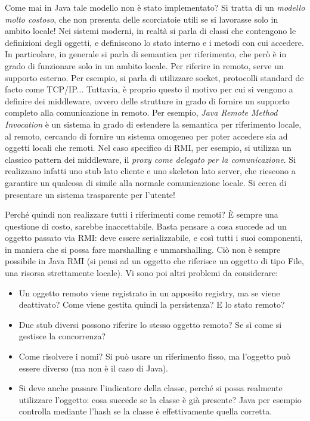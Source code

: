 Come mai in Java tale modello non è stato implementato? Si tratta di un
\textit{modello molto costoso}, che non presenta delle scorciatoie utili se si
lavorasse solo in ambito locale!
Nei sistemi moderni, in realtà si parla di classi che contengono le definizioni
degli oggetti, e definiscono lo stato interno e i metodi con cui accedere. In
particolare, in generale si parla di semantica per riferimento, che però è in
grado di funzionare solo in un ambito locale. Per riferire in remoto, serve un
supporto esterno. Per esempio, si parla di utilizzare socket, protocolli
standard de facto come TCP/IP...
Tuttavia, è proprio questo il motivo per cui si vengono a definire dei
middleware, ovvero delle strutture in grado di fornire un supporto completo alla 
comunicazione in remoto. Per esempio, \textit{Java Remote Method Invocation} è 
un sistema in grado di estendere la semantica per riferimento locale, al remoto, 
cercando di fornire un sistema omogeneo per poter accedere sia ad oggetti locali 
che remoti. Nel caso specifico di RMI, per esempio, si utilizza un classico 
pattern dei middleware, il \textit{proxy come delegato per la comunicazione}. Si 
realizzano infatti uno stub lato cliente e uno skeleton lato server, che 
riescono a garantire un qualcosa di simile alla normale comunicazione locale. Si 
cerca di presentare un sistema trasparente per l'utente!

Perché quindi non realizzare tutti i riferimenti come remoti?
È sempre una questione di costo, sarebbe inaccettabile. Basta pensare a cosa 
succede ad un oggetto passato via RMI: deve essere serializzabile, e così tutti
i suoi componenti, in maniera che si possa fare marshalling e unmarshalling.
Ciò non è sempre possibile in Java RMI (si pensi ad un oggetto che riferisce un
oggetto di tipo File, una risorsa strettamente locale). Vi sono poi altri 
problemi da considerare:

\begin{itemize}
 \item Un oggetto remoto viene registrato in un apposito registry, ma se
 viene deattivato? Come viene gestita quindi la persistenza? E lo stato remoto?
 \item Due stub diversi possono riferire lo stesso oggetto remoto? Se sì come si
 gestisce la concorrenza?
 \item Come risolvere i nomi? Si può usare un riferimento fisso, ma l'oggetto
 può essere diverso (ma non è il caso di Java).
 \item Si deve anche passare l'indicatore della classe, perché si possa
 realmente utilizzare l'oggetto: cosa succede  se la classe è già presente? Java 
per esempio controlla mediante l'hash se la classe è effettivamente quella 
corretta.
\end{itemize}


